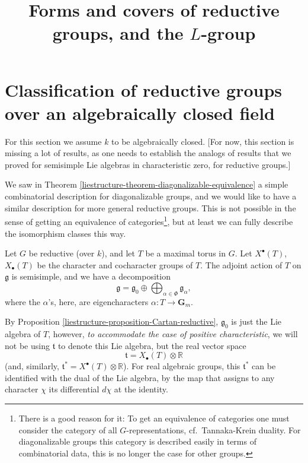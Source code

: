 

%


\title{Forms and covers of reductive groups, and the $L$-group}


\maketitle

\label{section-phantom}

\tableofcontents



\section{Classification of reductive groups over an algebraically closed field}
\label{section-classification-reductive}


For this section we assume $k$ to be algebraically closed. [For now, this section is missing a lot of results, as one needs to establish the analogs of results that we proved for semisimple Lie algebras in characteristic zero, for reductive groups.]

We saw in Theorem \ref{liestructure-theorem-diagonalizable-equivalence} a simple combinatorial description for diagonalizable groups, and we would like to have a similar description for more general reductive groups. This is not possible in the sense of getting an equivalence of categories\footnote{There is a good reason for it: To get an equivalence of categories one must consider the category of all $G$-representations, cf.\ Tannaka-Krein duality. For diagonalizable groups this category is described easily in terms of combinatorial data, this is no longer the case for other groups.}, but at least we can fully describe the isomorphism classes this way.


Let $G$ be reductive (over $k$), and let $T$ be a maximal torus in $G$. Let $X^\bullet(T)$, $X_\bullet(T)$ be the character and cocharacter groups of $T$. The adjoint action of $T$ on $\mathfrak g$ is semisimple, and we have a decomposition 
$$\mathfrak g = \mathfrak g_0 \oplus \bigoplus_{\alpha\in\Phi} \mathfrak g_\alpha,$$
where the $\alpha$'s, here, are eigencharacters $\alpha: T\to \mathbf G_m$. 

By Proposition \ref{liestructure-proposition-Cartan-reductive}, $\mathfrak g_0$ is just the Lie algebra of $T$, however, \emph{to accommodate the case of positive characteristic}, we will not be using $\mathfrak t$ to denote this Lie algebra, but the real vector space
$$ \mathfrak t = X_\bullet(T)\otimes \mathbb R$$
(and, similarly, $\mathfrak t^*= X^\bullet(T)\otimes \mathbb R$). For real algebraic groups, this $\mathfrak t^*$ can be identified with the dual of the Lie algebra,  by the map that assigns to any character $\chi$ its differential $d\chi$ at the identity. 

